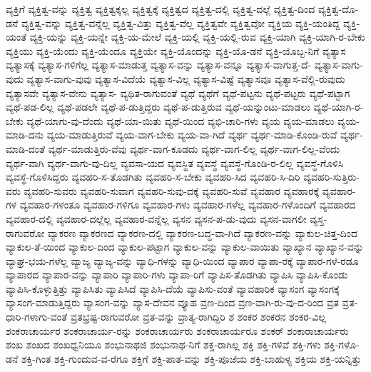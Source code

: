 {ವ್ಯಕ್ತಿಗೆ
ವ್ಯಕ್ತಿತ್ವ-ವನ್ನು
ವ್ಯಕ್ತಿತ್ವ
ವ್ಯಕ್ತಿತ್ವಕ್ಕಲ್ಲ
ವ್ಯಕ್ತಿತ್ವಕ್ಕೆ
ವ್ಯಕ್ತಿತ್ವದ
ವ್ಯಕ್ತಿತ್ವ-ದಲ್ಲಿ
ವ್ಯಕ್ತಿತ್ವ-ದಲ್ಲೆ
ವ್ಯಕ್ತಿತ್ವ-ದಿಂದ
ವ್ಯಕ್ತಿತ್ವ-ದೊ-ಡನೆ
ವ್ಯಕ್ತಿತ್ವ-ವನ್ನು
ವ್ಯಕ್ತಿತ್ವ-ವನ್ನೆಲ್ಲ
ವ್ಯಕ್ತಿತ್ವ-ವಿತ್ತು
ವ್ಯಕ್ತಿತ್ವ-ವೆಲ್ಲ
ವ್ಯಕ್ತಿತ್ವವೇ
ವ್ಯಕ್ತಿತ್ವವೋ
ವ್ಯಕ್ತಿಯ
ವ್ಯಕ್ತಿ-ಯಂತಿದ್ದ
ವ್ಯಕ್ತಿ-ಯಂತೆ
ವ್ಯಕ್ತಿ-ಯನ್ನು
ವ್ಯಕ್ತಿ-ಯನ್ನೇ
ವ್ಯಕ್ತಿ-ಯ-ಮೇಲೆ
ವ್ಯಕ್ತಿ-ಯಲ್ಲಿ
ವ್ಯಕ್ತಿ-ಯಲ್ಲಿ-ರುವ
ವ್ಯಕ್ತಿ-ಯಾಗಿ
ವ್ಯಕ್ತಿ-ಯಾಗಿ-ರ-ಬೇಕು
ವ್ಯಕ್ತಿಯು
ವ್ಯಕ್ತಿ-ಯೆಂದು
ವ್ಯಕ್ತಿ-ಯೆಂದೂ
ವ್ಯಕ್ತಿಯೇ
ವ್ಯಕ್ತಿ-ಯೊಂದನ್ನು
ವ್ಯಕ್ತಿ-ಯೊ-ಡನೆ
ವ್ಯಕ್ತಿ-ಯೊಬ್ಬ-ನಿಗೆ
ವ್ಯತ್ಯಾಸ
ವ್ಯತ್ಯಾಸಕ್ಕೆ
ವ್ಯತ್ಯಾಸ-ಗಳಿಗೆಲ್ಲ
ವ್ಯತ್ಯಾಸ-ಮಾಡುತ್ತ
ವ್ಯತ್ಯಾಸ-ವನ್ನು
ವ್ಯತ್ಯಾಸ-ವನ್ನೂ
ವ್ಯತ್ಯಾಸ-ವಾಗುತ್ತ-ದೆ-
ವ್ಯತ್ಯಾಸ-ವಾಗು-ವುದು
ವ್ಯತ್ಯಾಸ-ವಾಗು-ವುವು
ವ್ಯತ್ಯಾಸ-ವಿದೆಯೆ
ವ್ಯತ್ಯಾಸ-ವಿಲ್ಲ
ವ್ಯತ್ಯಾಸ-ವಿಷ್ಟೆ
ವ್ಯತ್ಯಾಸವೂ
ವ್ಯತ್ಯಾಸ-ವೆಲ್ಲಿ-ರುವುದು
ವ್ಯತ್ಯಾಸವೇ
ವ್ಯತ್ಯಾಸ-ವೇನು
ವ್ಯತ್ಯಾಸ-
ವ್ಯಥಿತ-ರಾಗುವಂತೆ
ವ್ಯಥೆ
ವ್ಯಥೆಗೆ
ವ್ಯಥೆ-ಪಟ್ಟನು
ವ್ಯಥೆ-ಪಟ್ಟರು
ವ್ಯಥೆ-ಪಟ್ಟಾಗ
ವ್ಯಥೆ-ಪಡ-ಲಿಲ್ಲ
ವ್ಯಥೆ-ಪಡಲೇ
ವ್ಯಥೆ-ಪ-ಡುತ್ತಿದ್ದರು
ವ್ಯಥೆ-ಪ-ಡುತ್ತಿರುವ
ವ್ಯಥೆ-ಯನ್ನುಂಟು-ಮಾಡಲು
ವ್ಯಥೆ-ಯಾಗಿ-ರ-ಬೇಕು
ವ್ಯಥೆ-ಯಾಗು-ವು-ದೆಂದು
ವ್ಯಥೆ-ಯಾ-ಯಿತು
ವ್ಯಥೆ-ಯಿಂದ
ವ್ಯಭಿ-ಚಾರಿ-ಗಳು
ವ್ಯಯ
ವ್ಯಯ-ಮಾಡಲು
ವ್ಯಯ-ಮಾಡಿ-ದನು
ವ್ಯಯ-ಮಾಡುತ್ತಿರುವೆ
ವ್ಯಯ-ವಾಗ-ಬೇಕು
ವ್ಯಯ-ವಾ-ಗಿದೆ
ವ್ಯರ್ಥ
ವ್ಯರ್ಥ-ಮಾಡಿ-ಕೊಂಡಿ-ರುವೆ
ವ್ಯರ್ಥ-ಮಾಡಿ-ದಂತೆ
ವ್ಯರ್ಥ-ಮಾಡುತ್ತಿರು-ವೆವು
ವ್ಯರ್ಥ-ವಾಗ-ಕೂಡದು
ವ್ಯರ್ಥ-ವಾಗ-ಲಿಲ್ಲ
ವ್ಯರ್ಥ-ವಾಗ-ಲಿಲ್ಲ-ವೆಂದು
ವ್ಯರ್ಥ-ವಾಗಿ
ವ್ಯರ್ಥ-ವಾಗು-ವು-ದಿಲ್ಲ
ವ್ಯವಸಾ-ಯದ
ವ್ಯವಸ್ಥಿತ
ವ್ಯವಸ್ಥೆ
ವ್ಯವಸ್ಥೆ-ಗೊಂಡಿ-ರ-ಲಿಲ್ಲ
ವ್ಯವಸ್ಥೆ-ಗೊಳಿಸಿ
ವ್ಯವಸ್ಥೆ-ಗೊಳಿಸಿದ್ದರು
ವ್ಯವಹರಿ-ಸ-ತೊಡಗಿತು
ವ್ಯವಹರಿ-ಸ-ಬೇಕು
ವ್ಯವಹರಿ-ಸಿದ
ವ್ಯವಹರಿ-ಸಿ-ದಿರಿ
ವ್ಯವಹರಿ-ಸುತ್ತಿರು-ವರು
ವ್ಯವಹರಿ-ಸುವರು
ವ್ಯವಹರಿ-ಸುವಾಗ
ವ್ಯವಹರಿ-ಸುವು-ದಕ್ಕೆ
ವ್ಯವಹರಿ-ಸುವೆ
ವ್ಯವಹಾರ
ವ್ಯವಹಾರಕ್ಕೆ
ವ್ಯವಹಾರ-ಗಳ
ವ್ಯವಹಾರ-ಗಳಂತೂ
ವ್ಯವಹಾರ-ಗಳಿಗೂ
ವ್ಯವಹಾರ-ಗಳು
ವ್ಯವಹಾರ-ಗಳೆಲ್ಲ
ವ್ಯವಹಾರ-ಗಳೊಂದಿಗೆ
ವ್ಯವಹಾರದ
ವ್ಯವಹಾರ-ದಲ್ಲಿ
ವ್ಯವಹಾರ-ದಲ್ಲೆಲ್ಲ
ವ್ಯವಹಾರ-ವನ್ನೆಲ್ಲ
ವ್ಯಸನ
ವ್ಯಸನ-ಪ-ಡು-ವುದು
ವ್ಯಸನ-ವಾಗಲೀ
ವ್ಯಸ್ತ-ರಾಗುವರೋ
ವ್ಯಾಕರಣ
ವ್ಯಾಕರಣದ
ವ್ಯಾಕರಣ-ದಲ್ಲಿ
ವ್ಯಾಕರಣ-ಬದ್ಧ-ವಾ-ಗಿದೆ
ವ್ಯಾಕರಣ-ವನ್ನು
ವ್ಯಾಕುಲ-ಚಿತ್ತ-ದಿಂದ
ವ್ಯಾಕುಲ-ತೆ-ಯಿಂದ
ವ್ಯಾಕುಲ-ದಿಂದ
ವ್ಯಾಕುಲ-ಪಟ್ಟಾಗ
ವ್ಯಾಕುಲ-ವನ್ನು
ವ್ಯಾಕುಲ-ವಾಯಿತು
ವ್ಯಾಖ್ಯಾನ
ವ್ಯಾಖ್ಯಾನ-ವನ್ನು
ವ್ಯಾಘ್ರ-ಭಯ-ಗಳೆಲ್ಲ
ವ್ಯಾಜ್ಯ
ವ್ಯಾಜ್ಯ-ವನ್ನು
ವ್ಯಾಧಿ-ಗಳನ್ನು
ವ್ಯಾಧಿ-ಯಿಂದ
ವ್ಯಾಪಾರ
ವ್ಯಾಪಾ-ರಕ್ಕೆ
ವ್ಯಾಪಾರ-ಗಳೆ-ರಡೂ
ವ್ಯಾಪಾರದ
ವ್ಯಾಪಾರ-ವನ್ನು
ವ್ಯಾಪಾರಿ
ವ್ಯಾಪಾರಿ-ಗಳು
ವ್ಯಾಪಾ-ರಿಗೆ
ವ್ಯಾಪಿಸ-ತೊಡಗಿತು
ವ್ಯಾಪಿಸಿ
ವ್ಯಾಪಿಸಿ-ಕೊಂಡು
ವ್ಯಾಪಿಸಿ-ಕೊಳ್ಳುತ್ತಿತ್ತು
ವ್ಯಾಪಿಸಿತು
ವ್ಯಾಪಿಸಿದೆ
ವ್ಯಾಪಿಸಿ-ದೆಯೆ
ವ್ಯಾಪಿಸು-ವಂತೆ
ವ್ಯಾವಹಾರಿಕ
ವ್ಯಾಸಂಗ
ವ್ಯಾಸಂಗಕ್ಕೆ
ವ್ಯಾಸಂಗ-ಮಾಡುತ್ತಿದ್ದರು
ವ್ಯಾಸಂಗ-ವನ್ನು
ವ್ಯಾಸ-ದೇವನ
ವ್ಯೂಹ
ವ್ರಣ-ದಿಂದ
ವ್ರಣ-ವಾಗಿ-ರು-ವು-ದ-ರಿಂದ
ವ್ರತ
ವ್ರತ-ಧಾರಿ-ಗಳಾಗು-ವಂತೆ
ವ್ರತಭ್ರಷ್ಟ-ರಾಗುವರೋ
ವ್ರತ-ವನ್ನು
ವ್ರಾತ್ಯ-ರಾಗಿದ್ದಿರಿ
ಶ
ಶಂಕರ
ಶಂಕರನ
ಶಂಕರ-ವಿಲ್ಲ
ಶಂಕರಾಚಾರ್ಯರ
ಶಂಕರಾಚಾರ್ಯ-ರನ್ನು
ಶಂಕರಾಚಾರ್ಯರು
ಶಂಕರಾಚಾರ್ಯರೂ
ಶಂಕರ್
ಶಂಕಾರಾಚಾರ್ಯರು
ಶಂಖ
ಶಂಖದ
ಶಂಖಧ್ವನಿಯೂ
ಶಂಭುನಾಥಜಿ
ಶಂಭುನಾಥ-ನಿಗೆ
ಶಕ್ತ-ರಾಗಿಲ್ಲ
ಶಕ್ತಿ
ಶಕ್ತಿ-ಗಳಿವೆ
ಶಕ್ತಿ-ಗಳು
ಶಕ್ತಿ-ಗಳೊ-ಡನೆ
ಶಕ್ತಿ-ಗಿಂತ
ಶಕ್ತಿ-ಗುಂದುವ-ವ-ರೆಗೂ
ಶಕ್ತಿಗೆ
ಶಕ್ತಿ-ಪಾತ-ವನ್ನು
ಶಕ್ತಿ-ಪೂಜೆಯ
ಶಕ್ತಿ-ಬಾಹುಳ್ಯ
ಶಕ್ತಿಯ
ಶಕ್ತಿ-ಯನ್ನಿತ್ತು
}
